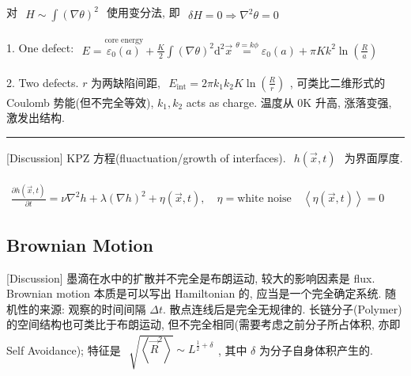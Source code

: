 \documentclass[../../main.tex]{subfiles}
\begin{document}
对 $\begin{aligned}
    H\sim \int(\nabla\theta)^{2}
\end{aligned}$ 使用变分法, 即 $\begin{aligned}
    \delta H = 0\Rightarrow \nabla^{2}\theta = 0
\end{aligned}$

1. One defect: $\begin{aligned}
    E = \stackrel{\text{core energy}}{\varepsilon_{0}(a)} + \frac{K}{2}\int(\nabla\theta)^{2}\mathrm{d}^{2}\vec{x} \stackrel{\theta=k\phi}{=} \varepsilon_{0}(a) + \pi K k^{2}\ln{\left(\frac{R}{a}\right)}
\end{aligned}$

2. Two defects. $r$ 为两缺陷间距, $\begin{aligned}
    E_{\text{int}} = 2\pi k_{1}k_{2}K\ln{\left(\frac{R}{r}\right)}
\end{aligned}$, 可类比二维形式的 Coulomb 势能(但不完全等效), $k_{1},k_{2}$ acts as charge. 温度从 0K 升高, 涨落变强, 激发出结构.

\vspace{0.3em}\hrule\vspace{0.3em}

[Discussion] KPZ 方程(fluactuation/growth of interfaces). $\begin{aligned}
    h\left(\vec{x},t\right)
\end{aligned}$ 为界面厚度. 

$\begin{aligned}
    \frac{\partial h\left(\vec{x},t\right)}{\partial t} = \nu\nabla^{2}h + \lambda\left(\nabla h\right)^{2} + \eta\left(\vec{x},t\right),\quad \eta = \text{white noise}\quad \left\langle \eta\left(\vec{x},t\right)\right\rangle = 0
\end{aligned}$

\subsection{Brownian Motion}
[Discussion] 墨滴在水中的扩散并不完全是布朗运动, 较大的影响因素是 flux. Brownian motion 本质是可以写出 Hamiltonian 的, 应当是一个完全确定系统. 随机性的来源: 观察的时间间隔 $\Delta t$. 散点连线后是完全无规律的. 长链分子(Polymer) 的空间结构也可类比于布朗运动, 但不完全相同(需要考虑之前分子所占体积, 亦即 Self Avoidance); 特征是 $\begin{aligned}
    \sqrt{\left\langle \vec{R}^{2}\right\rangle} \sim L^{\frac{1}{2}+\delta}
\end{aligned}$, 其中 $\delta$ 为分子自身体积产生的. 
\end{document}
